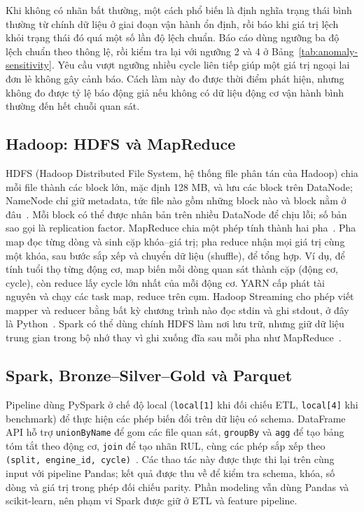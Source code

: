 Khi không có nhãn bất thường, một cách phổ biến là định nghĩa trạng thái bình
thường từ chính dữ liệu ở giai đoạn vận hành ổn định, rồi báo khi giá trị lệch khỏi
trạng thái đó quá một số lần độ lệch chuẩn. Báo cáo dùng ngưỡng ba độ lệch chuẩn
theo thông lệ, rồi kiểm tra lại với ngưỡng 2 và 4 ở
Bảng~\ref{tab:anomaly-sensitivity}. Yêu cầu vượt ngưỡng nhiều cycle liên tiếp giúp
một giá trị ngoại lai đơn lẻ không gây cảnh báo. Cách làm này đo được
thời điểm phát hiện, nhưng không đo được tỷ lệ báo động giả nếu không có dữ liệu
động cơ vận hành bình thường đến hết chuỗi quan sát.

\subsection{Hadoop: HDFS và MapReduce}
\label{sec:theory-hadoop}
HDFS (Hadoop Distributed File System, hệ thống file phân tán của Hadoop) chia mỗi
file thành các block lớn, mặc định 128 MB, và lưu các block trên DataNode; NameNode
chỉ giữ metadata, tức file nào gồm những block nào và block nằm ở đâu~\cite{shvachko2010hdfs}.
Mỗi block có thể được nhân bản trên nhiều DataNode để chịu lỗi; số bản sao gọi là
replication factor. MapReduce chia một phép tính thành hai pha~\cite{dean2008mapreduce}.
Pha map đọc từng dòng và sinh cặp khóa--giá trị; pha reduce nhận mọi giá trị cùng
một khóa, sau bước sắp xếp và chuyển dữ liệu (shuffle), để tổng hợp. Ví dụ, để tính
tuổi thọ từng động cơ, map biến mỗi dòng quan sát thành cặp (động cơ, cycle), còn
reduce lấy cycle lớn nhất của mỗi động cơ. YARN cấp phát tài nguyên và chạy các
task map, reduce trên cụm. Hadoop Streaming cho phép viết mapper và reducer bằng bất
kỳ chương trình nào đọc stdin và ghi stdout, ở đây là Python~\cite{hadoopStreaming}.
Spark có thể dùng chính HDFS làm nơi lưu trữ, nhưng giữ dữ liệu trung gian trong bộ
nhớ thay vì ghi xuống đĩa sau mỗi pha như MapReduce~\cite{zaharia2012rdd}.

\subsection{Spark, Bronze--Silver--Gold và Parquet}
Pipeline dùng PySpark ở chế độ local (\texttt{local[1]} khi đối chiếu ETL,
\texttt{local[4]} khi benchmark) để thực hiện các phép biến đổi
trên dữ liệu có schema. DataFrame API hỗ trợ \texttt{unionByName} để gom các file
quan sát, \texttt{groupBy} và \texttt{agg} để tạo bảng tóm tắt theo động cơ,
\texttt{join} để tạo nhãn RUL, cùng các phép sắp xếp theo
\texttt{(split, engine\_id, cycle)}~\cite{sparkSQLGuide}. Các thao tác này được
thực thi lại trên cùng input với pipeline Pandas; kết quả được thu về để kiểm tra
schema, khóa, số dòng và giá trị trong phép đối chiếu parity. Phần modeling vẫn
dùng Pandas và scikit-learn, nên phạm vi Spark được giữ ở ETL và feature pipeline.

